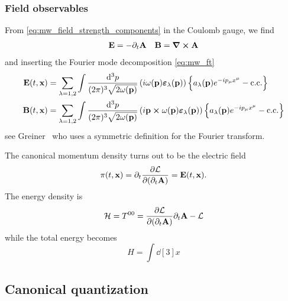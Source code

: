 \subsubsection{Field observables}

From \cref{eq:mw_field_strength_components} in the Coulomb gauge, we find
\begin{align}
	\vb{E}
	=
	-\partial_t\vb{A}
	&&
	\vb{B}
	=
	\curl\vb{A}
\end{align}
and inserting the Fourier mode decomposition \cref{eq:mw_ft}
\begin{align}
	\vb{E}(t,\vb{x})
	&=
	\sum_{\lambda=1,2}
	\int\frac{\dd[3]{p}}{(2\pi)^3\sqrt{2\omega(\vb{p})}}
	\left(
		i\omega(\vb{p})
		\boldsymbol{\varepsilon}_\lambda(\vb{p})
	\right)
	\left\{
		a_\lambda(\vb{p})
		e^{-ip_\mu x^\mu}
		-
		\text{c.c.}
	\right\}
	\\
	\vb{B}(t,\vb{x})
	&=
	\sum_{\lambda=1,2}
	\int\frac{\dd[3]{p}}{(2\pi)^3\sqrt{2\omega(\vb{p})}}
	\left(
		i\vb{p}\cross\omega(\vb{p})
		\boldsymbol{\varepsilon}_\lambda(\vb{p})
	\right)
	\left\{
		a_\lambda(\vb{p})
		e^{-ip_\mu x^\mu}
		-
		\text{c.c.}
	\right\}
\end{align}
see Greiner~\cite[p.~198]{Greiner2013} who uses a symmetric definition for the Fourier transform.

The canonical momentum density turns out to be the electric field
\begin{equation}
	\pi(t,\vb{x})
	=
	\partial_t\pdv{\mathcal{L}}{(\partial_t\vb{A})}
	=
	\vb{E}(t,\vb{x})
	\label{eq:mw_mom}.
\end{equation}
The energy density is
\begin{equation}
	\mathcal{H}
	=
	T^{00}
	=
	\pdv{\mathcal{L}}{(\partial_t\vb{A})}
	\partial_t\vb{A}
	-
	\mathcal{L}
\end{equation}
while the total energy becomes
\begin{equation}
	H
	=
	\int\dd[3]{x}
\end{equation}

\subsection{Canonical quantization}

